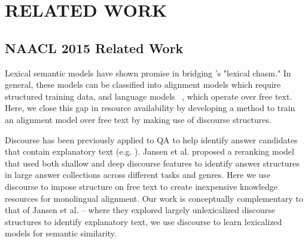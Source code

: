 \chapter{RELATED WORK\label{chapter:related_work}}


\section{NAACL 2015 Related Work}
\label{sec-naacl2015:related work}


Lexical semantic models have shown promise in bridging \citet{Berger:00}'s "lexical chasm."  In general, these models can be classified into alignment models \citep{echihabi2003noisy,Soricut:06,Riezler:etal:2007,Surdeanu:11,yao2013} which require structured training data, and language models ~\citep{jansen14,sultan-etal:2014:TACL,yih13}, which operate over free text.  Here, we close this gap in resource availability by developing a method to train an alignment model over free text by making use of discourse structures. 

  
  

Discourse has been previously applied to QA to help identify answer candidates that contain explanatory text (e.g. \citet{Verberne:2007}).
Jansen et al. \citeyear{jansen14} proposed a reranking model that used both shallow and deep discourse features to identify answer structures in large answer collections across different tasks and genres.  Here we use discourse to impose structure on free text to create inexpensive knowledge resources for monolingual alignment. Our work is conceptually complementary to that of Jansen et al. -- where they explored largely unlexicalized discourse structures to identify explanatory text, we use discourse to learn lexicalized models for semantic similarity.

